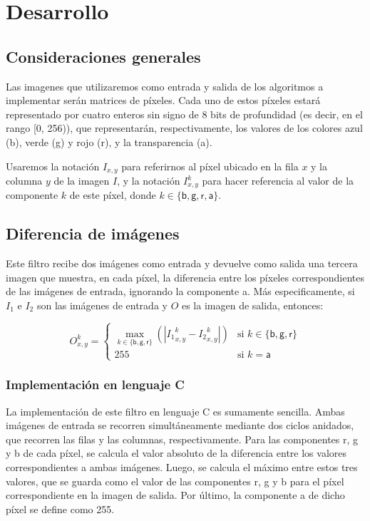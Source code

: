 \section{Desarrollo}

  \subsection{Consideraciones generales}
    Las imagenes que utilizaremos como entrada y salida de los algoritmos a implementar serán matrices de píxeles. Cada uno de estos píxeles estará representado por cuatro enteros sin signo de 8 bits de profundidad (es decir, en el rango [0, 256)), que representarán, respectivamente, los valores de los colores azul (\textsf{b}), verde (\textsf{g}) y rojo (\textsf{r}), y la transparencia (\textsf{a}).

    Usaremos la notación $I_{x,y}$ para referirnos al píxel ubicado en la fila $x$ y la columna $y$ de la imagen $I$, y la notación $I_{x,y}^k$ para hacer referencia al valor de la componente $k$ de este píxel, donde $k \in \lbrace \mathsf{b, g, r, a} \rbrace$.
  
  \subsection{Diferencia de imágenes}
    Este filtro recibe dos imágenes como entrada y devuelve como salida una tercera imagen que muestra, en cada píxel, la diferencia entre los píxeles correspondientes de las imágenes de entrada, ignorando la componente \textsf{a}. Más especificamente, si $I_1$ e $I_2$ son las imágenes de entrada y $O$ es la imagen de salida, entonces:

    \[ O_{x,y}^k = \begin{cases}
      \displaystyle \max_{k \in \lbrace \mathsf{b, g, r} \rbrace} \left( \left\vert {I_1}_{x,y}^k - {I_2}_{x,y}^k \right\vert \right)
        & \text{si } k \in \lbrace \mathsf{b, g, r} \rbrace \\
      255
        & \text{si } k = \mathsf{a}
    \end{cases} \]

    \subsubsection{Implementación en lenguaje C}
      La implementación de este filtro en lenguaje C es sumamente sencilla. Ambas imágenes de entrada se recorren simultáneamente mediante dos ciclos anidados, que recorren las filas y las columnas, respectivamente. Para las componentes \textsf{r}, \textsf{g} y \textsf{b} de cada píxel, se calcula el valor absoluto de la diferencia entre los valores correspondientes a ambas imágenes. Luego, se calcula el máximo entre estos tres valores, que se guarda como el valor de las componentes \textsf{r}, \textsf{g} y \textsf{b} para el píxel correspondiente en la imagen de salida. Por último, la componente \textsf{a} de dicho píxel se define como 255.

